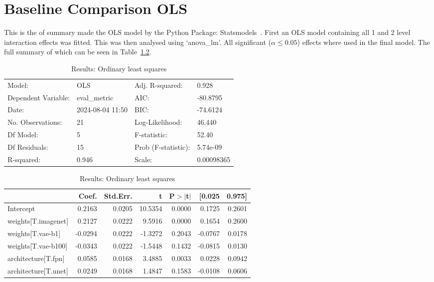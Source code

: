 \chapter{Baseline Comparison OLS}
\label{appendix:baselines_comparison_full}
This is the of summary made the OLS model by the Python Package: Statsmodels~\cite{josef_perktold_2024_10984387}. First an OLS model containing all 1 and 2 level interaction effects was fitted. This was then analysed using `anova\_lm'. All significant ($\alpha\le0.05$) effects where used in the final model. The full summary of which can be seen in Table~\ref{tab:comparison_baselines_full_ols}.

\begin{table}[ht]
\caption{Results: Ordinary least squares}
\label{tab:comparison_baselines_full_ols}
\begin{center}
\begin{tabular}{llll}
\hline
Model:              & OLS              & Adj. R-squared:     & 0.928       \\
Dependent Variable: & eval\_metric     & AIC:                & -80.8795    \\
Date:               & 2024-08-04 11:50 & BIC:                & -74.6124    \\
No. Observations:   & 21               & Log-Likelihood:     & 46.440      \\
Df Model:           & 5                & F-statistic:        & 52.40       \\
Df Residuals:       & 15               & Prob (F-statistic): & 5.74e-09    \\
R-squared:          & 0.946            & Scale:              & 0.00098365  \\
\hline
\end{tabular}
\end{center}

\begin{center}
\begin{tabular}{lrrrrrr}
\hline
                     &   Coef. & Std.Err. &       t & P$> |$t$|$ &  [0.025 & 0.975]  \\
\hline
Intercept            &  0.2163 &   0.0205 & 10.5354 &      0.0000 &  0.1725 & 0.2601  \\
weights[T.imagenet]  &  0.2127 &   0.0222 &  9.5916 &      0.0000 &  0.1654 & 0.2600  \\
weights[T.vae-b1]    & -0.0294 &   0.0222 & -1.3272 &      0.2043 & -0.0767 & 0.0178  \\
weights[T.vae-b100]  & -0.0343 &   0.0222 & -1.5448 &      0.1432 & -0.0815 & 0.0130  \\
architecture[T.fpn]  &  0.0585 &   0.0168 &  3.4885 &      0.0033 &  0.0228 & 0.0942  \\
architecture[T.unet] &  0.0249 &   0.0168 &  1.4847 &      0.1583 & -0.0108 & 0.0606  \\
\hline
\end{tabular}
\end{center}


\end{table}
